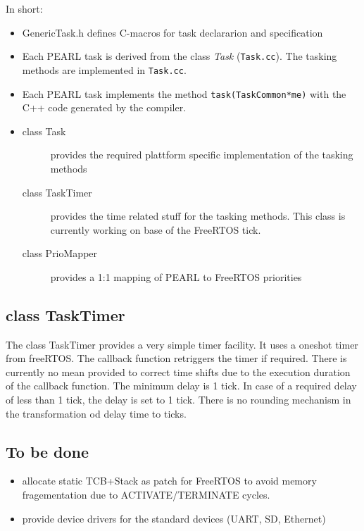In short:
\begin{itemize}
\item GenericTask.h defines C-macros for task declararion and specification
\item Each PEARL task is derived from the class {\em Task} (\verb|Task.cc|).
      The tasking methods are implemented in \verb|Task.cc|.
\item Each PEARL task implements the method \verb|task(TaskCommon*me)| 
    with the C++ code generated by the compiler.
\item {
  \begin{description}
  \item[class Task] provides the required plattform specific implementation
     of the tasking methods
  \item[class TaskTimer] provides the time related stuff for the tasking
     methods. This class is currently working on base of the 
     FreeRTOS tick.
  \item[class PrioMapper] provides a 1:1 mapping of PEARL to FreeRTOS
      priorities
  \end{description}
}
\end{itemize}

\subsection{class TaskTimer}
The class TaskTimer provides a very simple timer facility.
It uses a oneshot timer from freeRTOS. The callback function retriggers
the timer if required. There is currently no mean provided to correct 
time shifts due to the execution duration of the callback function.
The minimum delay is 1 tick. In case of a required delay of less than 1 tick,
the delay is set to 1 tick. There is no rounding mechanism in the 
transformation od delay time to ticks.


\subsection{To be done}
  \begin{itemize}
  \item allocate static TCB+Stack as patch for FreeRTOS to avoid 
    memory fragementation due to ACTIVATE/TERMINATE cycles.
  \item provide device drivers for the standard devices (UART, SD, Ethernet)

  \end{itemize}


